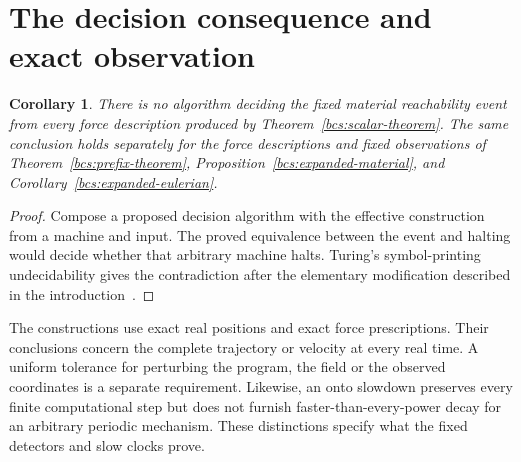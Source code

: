 \documentclass[11pt]{article}
\newtheorem{corollary}[theorem]{Corollary}
\begin{document}
\section{The decision consequence and exact observation}\label{sec:decision}
\begin{corollary}
There is no algorithm deciding the fixed material reachability event from every force description produced by Theorem~\ref{bcs:scalar-theorem}. The same conclusion holds separately for the force descriptions and fixed observations of Theorem~\ref{bcs:prefix-theorem}, Proposition~\ref{bcs:expanded-material}, and Corollary~\ref{bcs:expanded-eulerian}.
\end{corollary}
\begin{proof}
Compose a proposed decision algorithm with the effective construction from a machine and input. The proved equivalence between the event and halting would decide whether that arbitrary machine halts. Turing's symbol-printing undecidability gives the contradiction after the elementary modification described in the introduction~\cite[Section~8]{Turing1936}.
\end{proof}

The constructions use exact real positions and exact force prescriptions. Their conclusions concern the complete trajectory or velocity at every real time. A uniform tolerance for perturbing the program, the field or the observed coordinates is a separate requirement. Likewise, an onto slowdown preserves every finite computational step but does not furnish faster-than-every-power decay for an arbitrary periodic mechanism. These distinctions specify what the fixed detectors and slow clocks prove.



\end{document}
